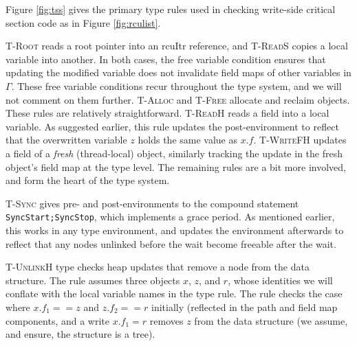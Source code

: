 Figure \ref{fig:tss} gives the primary type rules used in checking write-side critical section code as in Figure \ref{fig:rculist}.

\textsc{T-Root} reads a root pointer into an \textsf{rcuItr} reference, and \textsc{T-ReadS} copies a local variable into another.  In both cases, the free variable condition ensures that updating the modified variable does not invalidate field maps of other variables in $\Gamma$. These free variable conditions recur throughout the type system, and we will not comment on them further.
\textsc{T-Alloc} and \textsc{T-Free} allocate and reclaim objects. These rules are relatively straightforward.
\textsc{T-ReadH} reads a field into a local variable.
As suggested earlier, this rule updates the post-environment to reflect that the overwritten variable $z$ holds the same value as $x.f$.
\textsc{T-WriteFH} updates a field of a \emph{fresh} (thread-local) object, similarly tracking the update in the fresh object's field map at the type level.
The remaining rules are a bit more involved, and form the heart of the type system.

\textsc{T-Sync} gives pre- and post-environments to the compound statement \lstinline|SyncStart;SyncStop|, which implements a grace period.  As mentioned earlier, this works in any type environment, and updates the environment afterwards to reflect that any nodes \textsf{unlinked} before the wait become \textsf{freeable} after the wait.

\textsc{T-UnlinkH} type checks heap updates that remove a node from the data structure.  The rule assumes three objects $x$, $z$, and $r$, whose identities we will conflate with the local variable names in the type rule.  The rule checks the case where $x.f_1==z$ and $z.f_2==r$ initially (reflected in the path and field map components, and a write $x.f_1=r$ removes $z$ from the data structure (we assume, and ensure, the structure is a tree).


